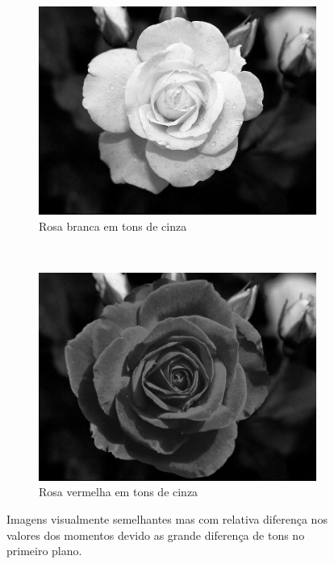 \begin{figure}[H]
  \begin{subfigure}{0.3\textwidth}
    \includegraphics[width=\textwidth]{imagens/flor_branca_pb.jpg}
    \caption{Rosa branca em tons de cinza}
    \label{fig:flor3}
  \end{subfigure}~
  \begin{subfigure}{0.3\textwidth}
    \includegraphics[width=\textwidth]{imagens/flor_vermelha_pb.jpg}
    \caption{Rosa vermelha em tons de cinza}
    \label{fig:flor4}
  \end{subfigure}

  \caption{ Imagens visualmente semelhantes mas com relativa diferença nos
    valores dos momentos devido as grande diferença de tons no primeiro plano. }
  \label{fig:flor_mmt}
\end{figure}

